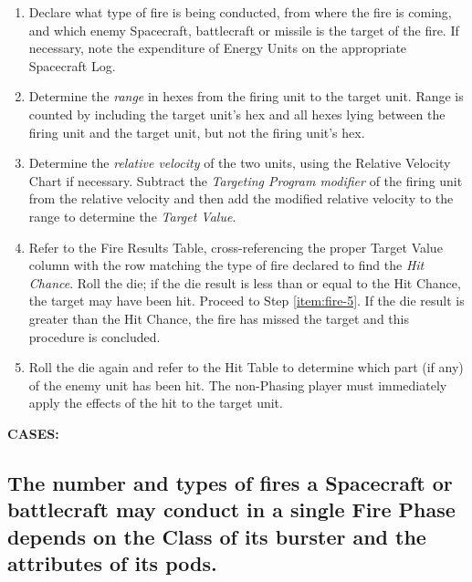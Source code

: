 \begin{enumerate}
\item Declare what type of fire is being conducted, from where the
  fire is coming, and which enemy Spacecraft, battlecraft or missile
  is the target of the fire. If necessary, note the expenditure of
  Energy Units on the appropriate Spacecraft Log.
\item Determine the \emph{range} in hexes from the firing unit to the
  target unit. Range is counted by including the target unit's hex and
  all hexes lying between the firing unit and the target unit, but not
  the firing unit's hex.
\item Determine the \emph{relative velocity} of the two units, using
  the Relative Velocity Chart if necessary. Subtract the
  \emph{Targeting Program modifier} of the firing unit from the
  relative velocity and then add the modified relative velocity to the
  range to determine the \emph{Target Value}.
\item Refer to the Fire Results Table, cross-referencing the proper
  Target Value column with the row matching the type of fire declared
  to find the \emph{Hit Chance}. Roll the die; if the die result is
  less than or equal to the Hit Chance, the target may have been hit.
  Proceed to Step \ref{item:fire-5}. If the die result is greater than
  the Hit Chance, the fire has missed the target and this procedure is
  concluded.
\item Roll the die again and refer to the Hit Table to determine which
  part (if any) of the enemy unit has been hit. The non-Phasing player
  must immediately apply the effects of the hit to the target
  unit.\label{item:fire-5}
\end{enumerate}

\medskip

\noindent\textbf{CASES:} 

\subsection[Number And Types Of Fires]{The number and types of fires a
  Spacecraft or battlecraft may conduct in a single Fire Phase depends
  on  
  the Class of its burster and the attributes of its pods.}
\label{sec:number-types-fires}

